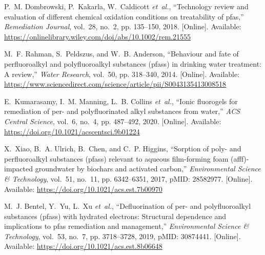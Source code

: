 \documentclass[journal,onecolumn]{IEEEtran}
\begin{document}
\begin{thebibliography}{48}
\BIBentryALTinterwordspacing
P.~M. Dombrowski, P.~Kakarla, W.~Caldicott \emph{et~al.}, ``Technology review
  and evaluation of different chemical oxidation conditions on treatability of
  pfas,'' \emph{Remediation Journal}, vol.~28, no.~2, pp. 135--150, 2018.
  [Online]. Available:
  \url{https://onlinelibrary.wiley.com/doi/abs/10.1002/rem.21555}
\BIBentrySTDinterwordspacing

\BIBentryALTinterwordspacing
M.~F. Rahman, S.~Peldszus, and W.~B. Anderson, ``Behaviour and fate of
  perfluoroalkyl and polyfluoroalkyl substances (pfass) in drinking water
  treatment: A review,'' \emph{Water Research}, vol.~50, pp. 318--340, 2014.
  [Online]. Available:
  \url{https://www.sciencedirect.com/science/article/pii/S0043135413008518}
\BIBentrySTDinterwordspacing

\BIBentryALTinterwordspacing
E.~Kumarasamy, I.~M. Manning, L.~B. Collins \emph{et~al.}, ``Ionic fluorogels
  for remediation of per- and polyfluorinated alkyl substances from water,''
  \emph{ACS Central Science}, vol.~6, no.~4, pp. 487--492, 2020. [Online].
  Available: \url{https://doi.org/10.1021/acscentsci.9b01224}
\BIBentrySTDinterwordspacing

\BIBentryALTinterwordspacing
X.~Xiao, B.~A. Ulrich, B.~Chen, and C.~P. Higgins, ``Sorption of poly- and
  perfluoroalkyl substances (pfass) relevant to aqueous film-forming foam
  (afff)-impacted groundwater by biochars and activated carbon,''
  \emph{Environmental Science \& Technology}, vol.~51, no.~11, pp. 6342--6351,
  2017, pMID: 28582977. [Online]. Available:
  \url{https://doi.org/10.1021/acs.est.7b00970}
\BIBentrySTDinterwordspacing

\BIBentryALTinterwordspacing
M.~J. Bentel, Y.~Yu, L.~Xu \emph{et~al.}, ``Defluorination of per- and
  polyfluoroalkyl substances (pfass) with hydrated electrons: Structural
  dependence and implications to pfas remediation and management,''
  \emph{Environmental Science \& Technology}, vol.~53, no.~7, pp. 3718--3728,
  2019, pMID: 30874441. [Online]. Available:
  \url{https://doi.org/10.1021/acs.est.8b06648}
\BIBentrySTDinterwordspacing


\end{thebibliography}
\end{document}
